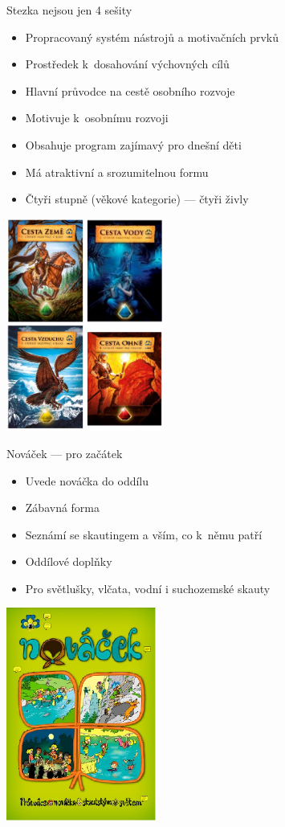 \documentclass[compress,xelatex,xcolor=dvipsnames,hyperref={pdfpagelabels=false},print]{beamer}
\begin{document}
\begin{frame}{Stezka nejsou jen 4 sešity}
\begin{multicols}{2}
\begin{itemize}
\item Propracovaný systém nástrojů a motivačních prvků
\item Prostředek k dosahování výchovných cílů
\item Hlavní průvodce na cestě osobního rozvoje
\item Motivuje k osobnímu rozvoji
\item Obsahuje program zajímavý pro dnešní děti
\item Má atraktivní a srozumitelnou formu
\item Čtyři stupně (věkové kategorie) --- čtyři živly
\end{itemize}
\columnbreak
\includegraphics[height=7cm]{stezky.png}
\end{multicols}
\end{frame}

\begin{frame}{Nováček --- pro začátek}
\begin{multicols}{2}
\begin{itemize}
\item Uvede nováčka do oddílu
\item Zábavná forma
\item Seznámí se skautingem a vším, co k~němu patří
\item Oddílové doplňky
\item Pro světlušky, vlčata, vodní i suchozemské skauty
\end{itemize}
\columnbreak
\includegraphics[height=7cm]{novacek.png}
\end{multicols}
\end{frame}
\end{document}
